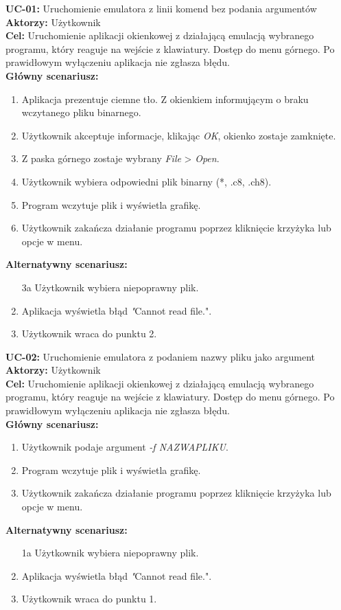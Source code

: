 \textbf{UC-01:} Uruchomienie emulatora z linii komend bez podania argumentów\\
\textbf{Aktorzy:} Użytkownik \\
\textbf{Cel:} Uruchomienie aplikacji okienkowej z działającą emulacją wybranego programu, który reaguje na wejście z klawiatury. Dostęp do menu górnego. Po prawidłowym wyłączeniu aplikacja nie zgłasza błędu. \\
\textbf{Główny scenariusz:}
\begin{enumerate}
  \item Aplikacja prezentuje ciemne tło. Z okienkiem informującym o braku wczytanego pliku binarnego.
  \item Użytkownik akceptuje informacje, klikając \textit{OK}, okienko zostaje zamknięte.
  \item Z paska górnego zostaje wybrany \textit{File} > \textit{Open}.
  \item Użytkownik wybiera odpowiedni plik binarny (*, .c8, .ch8).
  \item Program wczytuje plik i wyświetla grafikę.
  \item Użytkownik zakańcza działanie programu poprzez kliknięcie krzyżyka lub opcje w menu.
\end{enumerate}
\textbf{Alternatywny scenariusz:}
\begin{enumerate}
  \item [3a] Użytkownik wybiera niepoprawny plik.
  \item Aplikacja wyświetla błąd \textit"Cannot read file.".
  \item Użytkownik wraca do punktu 2.
\end{enumerate}

\textbf{UC-02:} Uruchomienie emulatora z podaniem nazwy pliku jako argument \\
\textbf{Aktorzy:} Użytkownik \\
\textbf{Cel:} Uruchomienie aplikacji okienkowej z działającą emulacją wybranego programu, który reaguje na wejście z klawiatury. Dostęp do menu górnego. Po prawidłowym wyłączeniu aplikacja nie zgłasza błędu. \\
\textbf{Główny scenariusz:}
\begin{enumerate}
  \item Użytkownik podaje argument \textit{-f NAZWAPLIKU}.
  \item Program wczytuje plik i wyświetla grafikę.
  \item Użytkownik zakańcza działanie programu poprzez kliknięcie krzyżyka lub opcje w menu.
\end{enumerate}
\textbf{Alternatywny scenariusz:}
\begin{enumerate}
  \item [1a] Użytkownik wybiera niepoprawny plik.
  \item Aplikacja wyświetla błąd \textit"Cannot read file.".
  \item Użytkownik wraca do punktu 1.
\end{enumerate}

